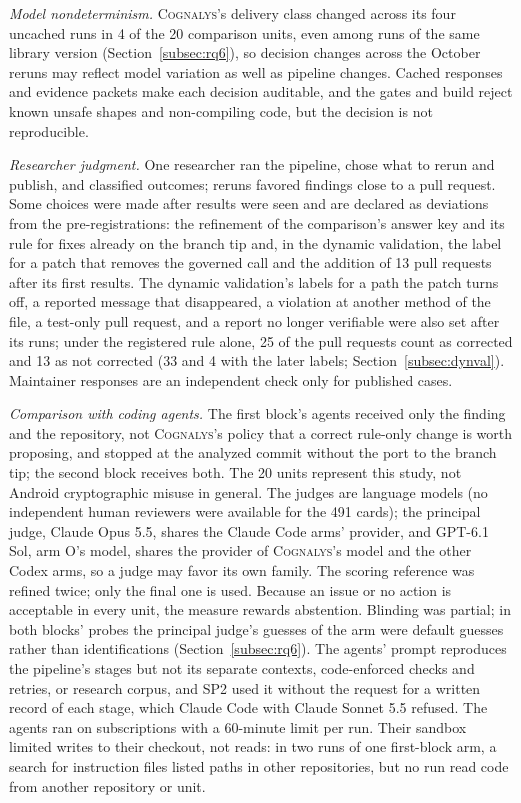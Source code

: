 \documentclass[conference]{IEEEtran}
\newcommand{\system}{\textsc{Cognalys}}
\begin{document}
\emph{Model nondeterminism.} \system{}'s delivery class changed across its four
uncached runs in 4 of the 20 comparison units, even among runs of the same
library version (Section~\ref{subsec:rq6}), so decision changes across the
October reruns may reflect model variation as well as pipeline changes. Cached
responses and evidence packets make each decision auditable, and the gates and
build reject known unsafe shapes and non-compiling code, but the decision is not
reproducible.

\emph{Researcher judgment.} One researcher ran the pipeline, chose what to
rerun and publish, and classified outcomes; reruns favored findings close to a
pull request. Some choices were made after results were seen and are declared
as deviations from the pre-registrations: the refinement of the comparison's
answer key and its rule for fixes already on the branch tip and, in the dynamic
validation, the label for a patch that removes the governed call and the
addition of 13 pull requests after its first results. The dynamic validation's
labels for a path the patch turns off, a reported message that disappeared, a
violation at another method of the file, a test-only pull request, and a report
no longer verifiable were also set after its runs; under the registered rule
alone, 25 of the pull requests count as corrected and 13 as not corrected (33 and 4 with the
later labels; Section~\ref{subsec:dynval}). Maintainer responses are an
independent check only for published cases.

\emph{Comparison with coding agents.} The first block's agents received only
the finding and the repository, not \system{}'s policy that a correct
rule-only change is worth proposing, and stopped at the analyzed commit
without the port to the branch tip; the second block receives both. The 20
units represent this study, not Android cryptographic misuse in general. The
judges are language models (no independent human reviewers were available
for the 491 cards); the principal judge, Claude Opus 5.5, shares the Claude
Code arms' provider, and GPT-6.1 Sol, arm O's model, shares the provider of
\system{}'s model and the other Codex arms, so a judge may favor its own family.
The scoring reference was refined twice; only the final one is used. Because an issue or no action is acceptable in every unit,
the measure rewards abstention. Blinding was partial; in both blocks' probes
the principal judge's guesses of the arm were default guesses rather than
identifications (Section~\ref{subsec:rq6}). The agents' prompt reproduces the
pipeline's stages but not its separate contexts, code-enforced checks and
retries, or research corpus, and SP2 used it without the request for a written
record of each stage, which Claude Code with Claude Sonnet 5.5 refused. The
agents ran on subscriptions with a 60-minute limit per run. Their sandbox
limited writes to their checkout, not reads: in two runs of one first-block arm,
a search for instruction files listed paths in other repositories, but no run
read code from another repository or unit.
\end{document}
